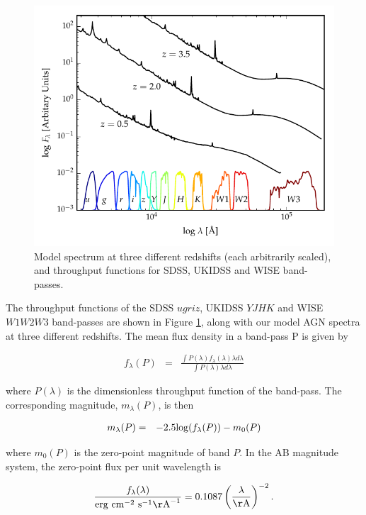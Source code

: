 \begin{figure}
  \centering
  \includegraphics[width=\textwidth]{figures/chapter05/throughput.pdf}
  \caption{Model spectrum at three different redshifts (each arbitrarily scaled), and throughput functions for SDSS, UKIDSS and WISE band-passes.}
  \label{fig:filters}
\end{figure}

The throughput functions of the SDSS $ugriz$, UKIDSS $YJHK$ and WISE $W1W2W3$ band-passes are shown in Figure \ref{fig:filters}, along with our model AGN spectra at three different redshifts. 
The mean flux density in a band-pass P is given by 

\begin{eqnarray}
  \label{eq:flux}
  f_{\lambda}(P) & = & \frac{\int P(\lambda) f_\lambda(\lambda) \lambda d\lambda }{\int P(\lambda) \lambda d\lambda}
\end{eqnarray}

where $P(\lambda)$ is the dimensionless throughput function of the band-pass. 
The corresponding magnitude, $m_\lambda(P)$, is then 

\begin{eqnarray}
  m_\lambda(P) & = & -2.5{\rm log}(f_\lambda(P)) - m_0(P)
\end{eqnarray}

where $m_0(P)$ is the zero-point magnitude of band $P$. In the AB magnitude system, the zero-point flux per unit wavelength is 

\begin{eqnarray}
  \frac{f_\lambda(\lambda)}{{\rm erg}~{\rm cm}^{-2}~{\rm s}^{-1} {\rm\AA}^{-1}} = 0.1087 \left(\frac{\lambda}{\rm \AA}\right)^{-2} .
\end{eqnarray}

